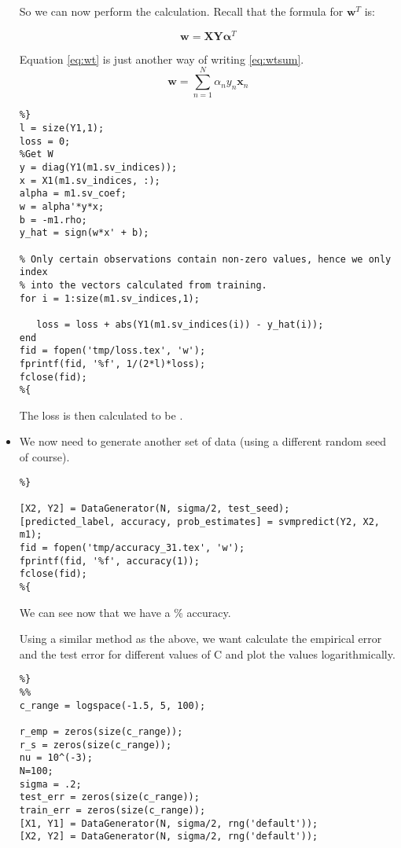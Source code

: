 \documentclass[11pt, twoside]{article}   	%
\begin{document}
\begin{itemize}
So we can now perform the calculation. Recall that the formula for
$\mathbf{w}^T$ is: 

\begin{equation}
\mathbf{w} = \mathbf{X}\mathbf{Y}\mathbf{\alpha}^T
\label{eq:wt}
\end{equation}


Equation \ref{eq:wt} is just another way of writing \ref{eq:wtsum}. 
\begin{equation}
\mathbf{w} = \sum\limits_{n=1}^N \alpha_n y_n \mathbf{x}_n
\label{eq:wtsum}
\end{equation}


\begin{lstlisting}
%}
l = size(Y1,1); 
loss = 0; 
%Get W
y = diag(Y1(m1.sv_indices));
x = X1(m1.sv_indices, :);
alpha = m1.sv_coef;
w = alpha'*y*x;
b = -m1.rho; 
y_hat = sign(w*x' + b);

% Only certain observations contain non-zero values, hence we only index
% into the vectors calculated from training. 
for i = 1:size(m1.sv_indices,1); 
  
   loss = loss + abs(Y1(m1.sv_indices(i)) - y_hat(i));
end
fid = fopen('tmp/loss.tex', 'w');
fprintf(fid, '%f', 1/(2*l)*loss); 
fclose(fid);
%{
\end{lstlisting}
The loss is then calculated to be . 

\item We now need to generate another set of data (using a different random 
 seed of course). 

\begin{lstlisting}
%}

[X2, Y2] = DataGenerator(N, sigma/2, test_seed);
[predicted_label, accuracy, prob_estimates] = svmpredict(Y2, X2, m1); 
fid = fopen('tmp/accuracy_31.tex', 'w');
fprintf(fid, '%f', accuracy(1)); 
fclose(fid); 
%{
\end{lstlisting}

We can see now that we have a \% accuracy. 

Using a similar method as the above, we want calculate the empirical error
and the test error for different values of C and plot the values
logarithmically. 
\begin{lstlisting}
%}
%%
c_range = logspace(-1.5, 5, 100);

r_emp = zeros(size(c_range)); 
r_s = zeros(size(c_range)); 
nu = 10^(-3);
N=100;
sigma = .2;
test_err = zeros(size(c_range)); 
train_err = zeros(size(c_range)); 
[X1, Y1] = DataGenerator(N, sigma/2, rng('default')); 
[X2, Y2] = DataGenerator(N, sigma/2, rng('default')); 


\end{lstlisting}
\end{itemize}
\end{document}
